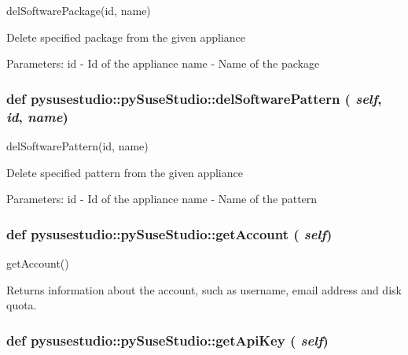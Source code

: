 \label{classpysusestudio_1_1py_suse_studio_a85fb426704d174487ce90469476e319a}
\begin{DoxyVerb}delSoftwarePackage(id, name)

            Delete specified package from the given appliance
            
            Parameters:
id - Id of the appliance
name - Name of the package

\end{DoxyVerb}
 \hypertarget{classpysusestudio_1_1py_suse_studio_a05a10bd3b9fdf4eac43d620a9dde588f}{
\subsubsection[{delSoftwarePattern}]{\setlength{\rightskip}{0pt plus 5cm}def pysusestudio::pySuseStudio::delSoftwarePattern ( {\em self}, \/   {\em id}, \/   {\em name})}}
\label{classpysusestudio_1_1py_suse_studio_a05a10bd3b9fdf4eac43d620a9dde588f}
\begin{DoxyVerb}delSoftwarePattern(id, name)

            Delete specified pattern from the given appliance
            
            Parameters:
id - Id of the appliance
name - Name of the pattern

\end{DoxyVerb}
 \hypertarget{classpysusestudio_1_1py_suse_studio_a1b0687dee747d4237b2a4e979d6cbe3a}{
\subsubsection[{getAccount}]{\setlength{\rightskip}{0pt plus 5cm}def pysusestudio::pySuseStudio::getAccount ( {\em self})}}
\label{classpysusestudio_1_1py_suse_studio_a1b0687dee747d4237b2a4e979d6cbe3a}
\begin{DoxyVerb}getAccount()

        Returns information about the account, such as username, email address and disk quota.
\end{DoxyVerb}
 \hypertarget{classpysusestudio_1_1py_suse_studio_ada8fe51f723f7ccf7c7f2fe618281150}{
\subsubsection[{getApiKey}]{\setlength{\rightskip}{0pt plus 5cm}def pysusestudio::pySuseStudio::getApiKey ( {\em self})}}
